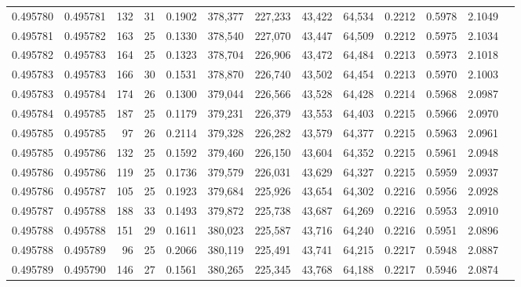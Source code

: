 \begin{tabular}{rrrrrrrrrrrrr}
0.495780 & 0.495781 & 132 &  31 &                                     0.1902 & 378,377 & 227,233 &  43,422 &  64,534 & 0.2212 & 0.5978 & 2.1049 \\
0.495781 & 0.495782 & 163 &  25 &                                     0.1330 & 378,540 & 227,070 &  43,447 &  64,509 & 0.2212 & 0.5975 & 2.1034 \\
0.495782 & 0.495783 & 164 &  25 &                                     0.1323 & 378,704 & 226,906 &  43,472 &  64,484 & 0.2213 & 0.5973 & 2.1018 \\
0.495783 & 0.495783 & 166 &  30 &                                     0.1531 & 378,870 & 226,740 &  43,502 &  64,454 & 0.2213 & 0.5970 & 2.1003 \\
0.495783 & 0.495784 & 174 &  26 &                                     0.1300 & 379,044 & 226,566 &  43,528 &  64,428 & 0.2214 & 0.5968 & 2.0987 \\
0.495784 & 0.495785 & 187 &  25 &                                     0.1179 & 379,231 & 226,379 &  43,553 &  64,403 & 0.2215 & 0.5966 & 2.0970 \\
0.495785 & 0.495785 &  97 &  26 &                                     0.2114 & 379,328 & 226,282 &  43,579 &  64,377 & 0.2215 & 0.5963 & 2.0961 \\
0.495785 & 0.495786 & 132 &  25 &                                     0.1592 & 379,460 & 226,150 &  43,604 &  64,352 & 0.2215 & 0.5961 & 2.0948 \\
0.495786 & 0.495786 & 119 &  25 &                                     0.1736 & 379,579 & 226,031 &  43,629 &  64,327 & 0.2215 & 0.5959 & 2.0937 \\
0.495786 & 0.495787 & 105 &  25 &                                     0.1923 & 379,684 & 225,926 &  43,654 &  64,302 & 0.2216 & 0.5956 & 2.0928 \\
0.495787 & 0.495788 & 188 &  33 &                                     0.1493 & 379,872 & 225,738 &  43,687 &  64,269 & 0.2216 & 0.5953 & 2.0910 \\
0.495788 & 0.495788 & 151 &  29 &                                     0.1611 & 380,023 & 225,587 &  43,716 &  64,240 & 0.2216 & 0.5951 & 2.0896 \\
0.495788 & 0.495789 &  96 &  25 &                                     0.2066 & 380,119 & 225,491 &  43,741 &  64,215 & 0.2217 & 0.5948 & 2.0887 \\
0.495789 & 0.495790 & 146 &  27 &                                     0.1561 & 380,265 & 225,345 &  43,768 &  64,188 & 0.2217 & 0.5946 & 2.0874 \\

\end{tabular}
